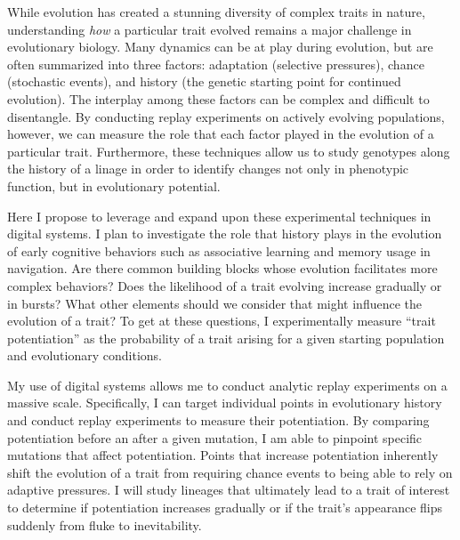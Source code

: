 
While evolution has created a stunning diversity of complex traits in nature, understanding \textit{how} a particular trait evolved remains a major challenge in evolutionary biology.
Many dynamics can be at play during evolution, but are often summarized into three factors: adaptation (selective pressures), chance (stochastic events), and history (the genetic starting point for continued evolution).
The interplay among these factors can be complex and difficult to disentangle.
By conducting replay experiments on actively evolving populations, however, we can measure the role that each factor played in the evolution of a particular trait.
Furthermore, these techniques allow us to study genotypes along the history of a linage in order to identify changes not only in phenotypic function, but in evolutionary potential.

Here I propose to leverage and expand upon these experimental techniques in digital systems.
I plan to investigate the role that history plays in the evolution of early cognitive behaviors such as associative learning and memory usage in navigation.
Are there common building blocks whose evolution facilitates more complex behaviors?
Does the likelihood of a trait evolving increase gradually or in bursts?
What other elements should we consider that might influence the evolution of a trait?
To get at these questions, I experimentally measure ``trait potentiation'' as the probability of a trait arising for a given starting population and evolutionary conditions.

My use of digital systems allows me to conduct analytic replay experiments on a massive scale.
Specifically, I can target individual points in evolutionary history and conduct replay experiments to measure their potentiation.
By comparing potentiation before an after a given mutation, I am able to pinpoint specific mutations that affect potentiation.
Points that increase potentiation inherently shift the evolution of a trait from requiring chance events to being able to rely on adaptive pressures.
I will study lineages that ultimately lead to a trait of interest to determine if potentiation increases gradually or if the trait's appearance flips suddenly from fluke to inevitability.

